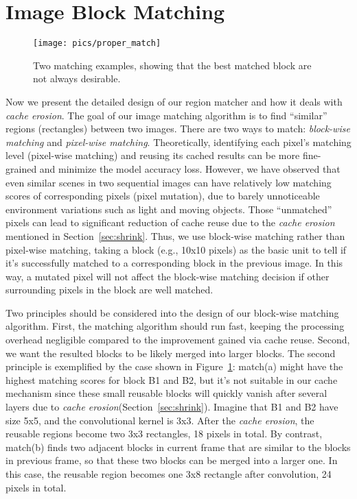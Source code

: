 \documentclass[10pt,acmtog]{acmart}
\newcommand{\shrink}{\emph{cache erosion}\xspace}
\newcommand{\revise}[1]{{#1}}
\begin{document}
\section{Image Block Matching}\label{sec:matching}\begin{figure}[t]
	\centering
	\texttt{[image: pics/proper\_match]}
	\caption{Two matching examples, showing that the best matched block are not always desirable.}
	\label{fig:proper_match}
\end{figure}%
Now we present the detailed design of our region matcher and how it deals with \shrink.
The goal of our image matching algorithm is to find ``similar'' regions (rectangles) between two images.
There are two ways to match: \textit{block-wise matching} and \textit{pixel-wise matching}.
Theoretically, identifying each pixel's matching level (pixel-wise matching) and reusing its cached results can be more fine-grained and minimize the model accuracy loss.
However, we have observed that even similar scenes in two sequential images can have relatively low matching scores of corresponding pixels (pixel mutation), due to barely unnoticeable environment variations such as light and moving objects.
Those ``unmatched'' pixels can lead to significant reduction of cache reuse due to the \shrink mentioned in Section~\ref{sec:shrink}.
Thus, we use block-wise matching rather than pixel-wise matching, taking a block (e.g., 10x10 pixels) as the basic unit to tell if it's successfully matched to a corresponding block in the previous image.
In this way, a mutated pixel will not affect the block-wise matching decision if other surrounding pixels in the block are well matched.

Two principles should be considered into the design of our block-wise matching algorithm.
First, the matching algorithm should run fast, keeping the processing overhead negligible compared to the improvement gained via cache reuse.
Second, we want the resulted blocks to be likely merged into larger blocks.
The second principle is exemplified by the case shown in Figure~\ref{fig:proper_match}: match(a) might have the highest matching scores for block B1 and B2, but it's not suitable in our cache mechanism since these small reusable blocks will quickly vanish after several layers due to \shrink (Section~\ref{sec:shrink}).
Imagine that B1 and B2 have size 5x5, and the convolutional kernel is 3x3.
After the \shrink, the reusable regions become two 3x3 rectangles, 18 pixels in total.
\revise{By contrast, match(b) finds two adjacent blocks in current frame that are similar to the blocks in previous frame, so that these two blocks can be merged into a larger one.
In this case, the reusable region becomes one 3x8 rectangle after convolution, 24 pixels in total.}
\end{document}
